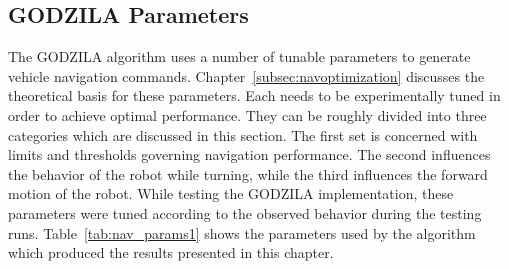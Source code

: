 


\subsection{GODZILA Parameters} \label{subsec:godzila_params}
The GODZILA algorithm uses a number of tunable parameters to generate vehicle 
navigation commands. Chapter~\ref{subsec:navoptimization} discusses the theoretical
basis for these parameters. Each needs to be experimentally tuned in order
to achieve optimal performance. They can be roughly divided into three categories which
are discussed in this section. The first set is concerned with limits and thresholds
governing navigation performance. The second influences the behavior of the robot while
turning, while the third influences the forward motion of the robot.
While testing the GODZILA implementation, these parameters were tuned according to the
observed behavior during the testing runs. Table~\ref{tab:nav_params1} shows the parameters used
by the algorithm which produced the results presented in this chapter.

